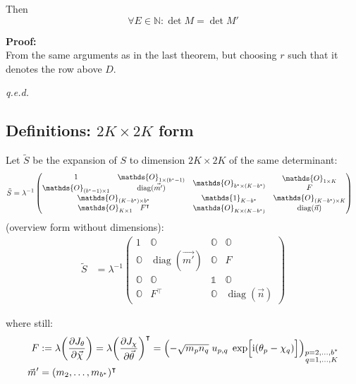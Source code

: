 \documentclass[
	english,
	a4paper,
	fontsize=10pt,
	parskip=half,
	titlepage=true,
	DIV=12,
	final
]{scrreprt}
\newcommand*{\transp}{\ensuremath{^\intercal}}
\newcommand*{\iunit}{\ensuremath{\mathrm{i}}}
\newcommand*{\setNaturals} {\ensuremath{\mathbb{N}}}
\DeclareMathOperator{\diag}{diag}
\begin{document}
Then
\[ \forall E \in \setNaturals : \det M = \det M' \]

\textbf{Proof:}\\
From the same arguments as in the last theorem, but choosing $r$ such that it denotes the row above $D$.
\begin{flushright}
	\emph{q.e.d.}
\end{flushright}


\subsection{Definitions: $2K \times 2K$ form}
Let $\tilde{S}$ be the expansion of $S$ to dimension $2K \times 2K$ of the same determinant:
\begin{align}
	\tilde{S}
&=
	\lambda^{-1}
	\begin{pmatrix}
		\mqty{	1 & \mathds{O}_{1 \times (b^* - 1)} \\ 
				\mathds{O}_{(b^* - 1) \times 1} & \diag(\vec{m'})} &
		\mathds{O}_{b^* \times (K - b^*)}	& 
		\mqty{\mathds{O}_{1 \times K} \\ F}
	\\
		\mathds{O}_{(K - b^*) \times b^*}  &  \mathds{1}_{K - b^*}  &  \mathds{O}_{(K - b^*) \times K}
	\\
		\mqty{\mathds{O}_{K \times 1} & F\transp} & 
		\mathds{O}_{K \times (K - b^*)} & \diag(\vec{n})
	\end{pmatrix}
\end{align}
(overview form without dimensions):
\begin{align}
	\tilde{S}
&=
	\lambda^{-1}
	\begin{pmatrix}
		1			& \mathds{O} 		& \mathds{O}		& \mathds{O} \\
		\mathds{O}	& \diag(\vec{m'})	& \mathds{O}		& F          \\
		\mathds{O}	& \mathds{O}			& \mathds{1}		& \mathds{O} \\
		\mathds{O}	& F\transp			& \mathds{O}		& \diag(\vec{n})
	\end{pmatrix}
\end{align}

where still:
\begin{align}
	F
&:=
	\lambda \qty( \pdv{J_{\theta}}{\vec{\chi}} ) 
	= \lambda \qty( \pdv{J_{\chi}}{\vec{\theta}} )\transp
	= \qty( -\sqrt{m_p n_q} \; u_{p,q} \; \exp[\Big. \iunit(\theta_p - \chi_q)] )_{
		\substack{p = 2, \ldots, b^* \\ q = 1, \ldots, K}
	}
\label{eqn:defDetOffDiagonalF}
\\
	\vec{m}'
&=
	(m_2, \ldots, m_{b^*})\transp
\end{align}
\end{document}

